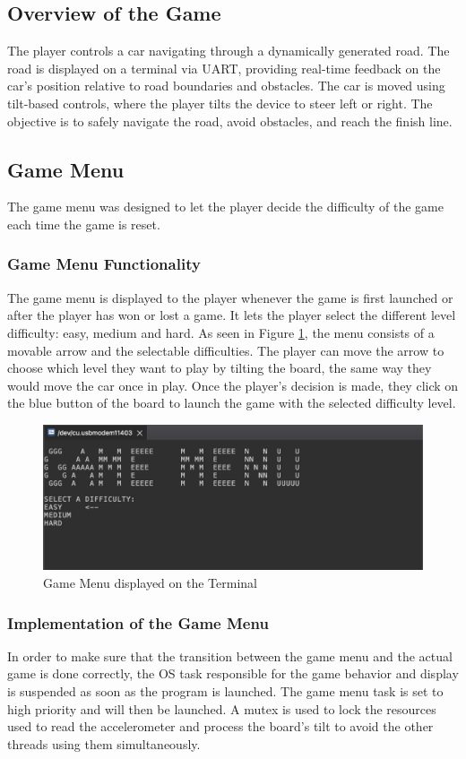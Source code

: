 \documentclass[conference]{IEEEtran}
\begin{document}
\subsection{Overview of the Game}
The player controls a car navigating through a dynamically generated road. The road is displayed on a terminal via UART, providing real-time feedback on the car's position relative to road boundaries and obstacles. The car is moved using tilt-based controls, where the player tilts the device to steer left or right. The objective is to safely navigate the road, avoid obstacles, and reach the finish line.
\subsection{Game Menu}
The game menu was designed to let the player decide the difficulty of the game each time the game is reset.

\subsubsection{Game Menu Functionality}
The game menu is displayed to the player whenever the game is first launched or after the player has won or lost a game. It lets the player select the different level difficulty: easy, medium and hard. As seen in Figure \ref{fig:game_menu}, the menu consists of a movable arrow and the selectable difficulties. The player can move the arrow to choose which level they want to play by tilting the board, the same way they would move the car once in play. Once the player's decision is made, they click on the blue button of the board to launch the game with the selected difficulty level. 
\begin{figure}
    \centering
    \includegraphics[width=1\linewidth]{Game Menu.pdf}
    \caption{Game Menu displayed on the Terminal}
    \label{fig:game_menu}
\end{figure}

\subsubsection{Implementation of the Game Menu}
In order to make sure that the transition between the game menu and the actual game is done correctly, the OS task responsible for the game behavior and display is suspended as soon as the program is launched. The game menu task is set to high priority and will then be launched. A mutex is used to lock the resources used to read the accelerometer and process the board's tilt to avoid the other threads using them simultaneously. 
\end{document}
